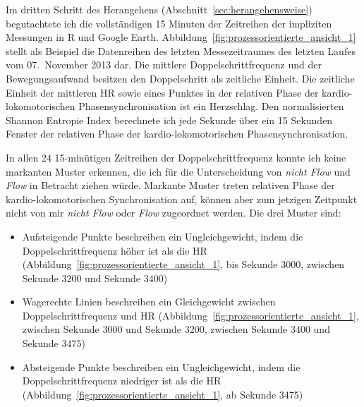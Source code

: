 \label{ssub:prozessorientierter_ansatz_5_1} 
\begin{sidewaysfigure}
	\resizebox{1.00 
	\textwidth}{!}{
	
	 }
	
	\caption[Beispielhafte Prozessdarstellung des letzten Laufabschnittes vom 07. November 2013 (Erste Studie: Laufen)]{Beispielhafte Prozessdarstellung des letzten Laufabschnittes vom 07. November 2013 \\
	\hspace{ 
	\textwidth} \emph{Anmerkung}: Rel. Phase = Relative Phase} \label{fig:prozessorientierte_ansicht_1} 
\end{sidewaysfigure}

Im dritten Schritt des Herangehens (Abschnitt~\ref{sec:herangehensweise}) begutachtete ich die vollständigen 15 Minuten der Zeitreihen der impliziten Messungen in R und Google Earth. Abbildung~\ref{fig:prozessorientierte_ansicht_1} stellt als Beispiel die Datenreihen des letzten Messezeitraumes des letzten Laufes vom 07.~November 2013 dar. Die mittlere Doppelschrittfrequenz und der Bewegungsaufwand besitzen den Doppelschritt als zeitliche Einheit. Die zeitliche Einheit der mittleren \ac{HR} sowie eines Punktes in der relativen Phase der kardio-lokomotorischen Phasensynchronisation ist ein Herzschlag. Den normalisierten Shannon Entropie Index berechnete ich jede Sekunde über ein 15 Sekunden Fenster der relativen Phase der kardio-lokomotorischen Phasensynchronisation. 

In allen 24 15-minütigen Zeitreihen der Doppelschrittfrequenz konnte ich keine markanten Muster erkennen, die ich für die Unterscheidung von \emph{nicht Flow} und \emph{Flow} in Betracht ziehen würde. Markante Muster treten relativen Phase der kardio-lokomotorischen Synchronisation auf, können aber zum jetzigen Zeitpunkt nicht von mir \emph{nicht Flow} oder \emph{Flow} zugeordnet werden. Die drei Muster sind: 
\begin{itemize}
	
	\item Aufsteigende Punkte beschreiben ein Ungleichgewicht, indem die Doppelschrittfrequenz höher ist als die \ac{HR} (Abbildung~\ref{fig:prozessorientierte_ansicht_1}, bis Sekunde 3000, zwischen Sekunde 3200 und Sekunde 3400)
	
	\item Wagerechte Linien beschreiben ein Gleichgewicht zwischen Doppelschrittfrequenz und \ac{HR} (Abbildung~\ref{fig:prozessorientierte_ansicht_1}, zwischen Sekunde 3000 und Sekunde 3200, zwischen Sekunde 3400 und Sekunde 3475)
	
	\item Absteigende Punkte beschreiben ein Ungleichgewicht, indem die Doppelschrittfrequenz niedriger ist als die \ac{HR} (Abbildung~\ref{fig:prozessorientierte_ansicht_1}, ab Sekunde 3475) 
\end{itemize}

